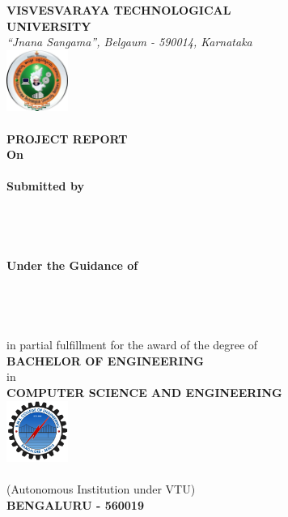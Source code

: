 \documentclass[a4paper,12pt]{report}
\begin{document}
\begin{titlepage}
    \centering
    \textbf{\large VISVESVARAYA TECHNOLOGICAL \\ UNIVERSITY} \\
    \textit{“Jnana Sangama”, Belgaum - 590014, Karnataka} \\[0.5cm]

    \includegraphics[width=2cm]{../assets/vtu_logo.png} \\[0.5cm]

    \textbf{\large \course \\ PROJECT REPORT} \\[0.4cm]
    \textbf{On} \\[0.3cm]
    \textbf{\LARGE \projectname} \\[0.5cm]

    \textbf{Submitted by} \\[0.5cm]
    \textbf{\one } \\
    \textbf{\two } \\
    \textbf{\three } \\
    \textbf{\four } \\[0.5cm]

    \textbf{Under the Guidance of} \\[0.3cm]
    \textbf{\guidename} \\ 
    \textbf{\guidedesignation} \\
    \textbf{\guidedept} \\
    \textbf{\collegename}\\ [0.8cm]

    in partial fulfillment for the award of the degree of \\[0.3cm]
    \textbf{BACHELOR OF ENGINEERING} \\[0.3cm]
    in \\[0.3cm]
    \textbf{COMPUTER SCIENCE AND ENGINEERING} \\[0.5cm]

    \includegraphics[width=2cm]{../assets/college_logo.png} \\[0.5cm]

    \textbf{\large \collegename} \\
    (Autonomous Institution under VTU) \\[0.3cm]
    \textbf{BENGALURU - 560019} \\[0.3cm]
    \textbf{\years}

\end{titlepage}
\newpage
\end{document}
